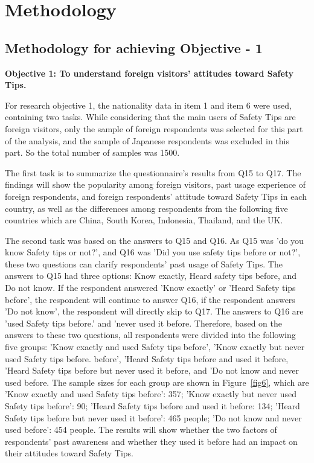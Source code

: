 


\chapter{Methodology }
\label{c4}
\section{Methodology for achieving Objective - 1 }

\textbf{Objective 1: To understand foreign visitors' attitudes toward Safety Tips.}

For research objective 1, the nationality data in item 1 and item 6 were used, containing two tasks. While considering that the main users of Safety Tips are foreign visitors, only the sample of foreign respondents was selected for this part of the analysis, and the sample of Japanese respondents was excluded in this part. So the total number of samples was 1500.

The first task is to summarize the questionnaire's results from Q15 to Q17. The findings will show the popularity among foreign visitors, past usage experience of foreign respondents, and foreign respondents' attitude toward Safety Tips in each country, as well as the differences among respondents from the following five countries which are China, South Korea, Indonesia, Thailand, and the UK.

The second task was based on the answers to Q15 and Q16. As Q15 was 'do you know Safety tips or not?', and Q16 was 'Did you use safety tips before or not?', these two questions can clarify respondents' past usage of Safety Tips. The answers to Q15 had three options: Know exactly, Heard safety tips before, and Do not know. If the respondent answered 'Know exactly' or 'Heard Safety tips before', the respondent will continue to answer Q16, if the respondent answers 'Do not know', the respondent will directly skip to Q17. The answers to Q16 are 'used Safety tips before.' and 'never used it before. Therefore, based on the answers to these two questions, all respondents were divided into the following five groups: 'Know exactly and used Safety tips before', 'Know exactly but never used Safety tips before. before', 'Heard Safety tips before and used it before, 'Heard Safety tips before but never used it before, and 'Do not know and never used before. The sample sizes for each group are shown in Figure~\ref{fig6}, which are 'Know exactly and used Safety tips before': 357; 'Know exactly but never used Safety tips before': 90; 'Heard Safety tips before and used it before: 134; 'Heard Safety tips before but never used it before': 465 people; 'Do not know and never used before': 454 people. The results will show whether the two factors of respondents' past awareness and whether they used it before had an impact on their attitudes toward Safety Tips.


